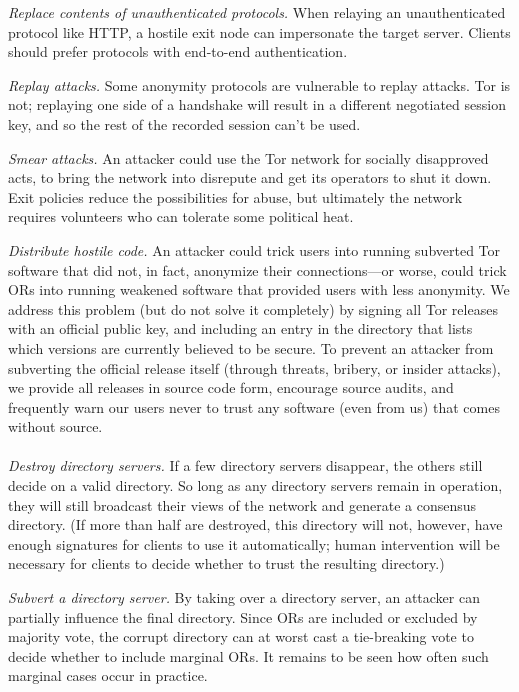 \documentclass[times,10pt,twocolumn]{article}
\begin{document}
\emph{Replace contents of unauthenticated protocols.}  When
relaying an unauthenticated protocol like HTTP, a hostile exit node
can impersonate the target server. Clients
should prefer protocols with end-to-end authentication.

\emph{Replay attacks.} Some anonymity protocols are vulnerable
to replay attacks.  Tor is not; replaying one side of a handshake
will result in a different negotiated session key, and so the rest
of the recorded session can't be used.

\emph{Smear attacks.} An attacker could use the Tor network for
socially disapproved acts, to bring the
network into disrepute and get its operators to shut it down.
Exit policies reduce the possibilities for abuse, but
ultimately the network requires volunteers who can tolerate
some political heat.

\emph{Distribute hostile code.} An attacker could trick users
into running subverted Tor software that did not, in fact, anonymize
their connections---or worse, could trick ORs into running weakened
software that provided users with less anonymity.  We address this
problem (but do not solve it completely) by signing all Tor releases
with an official public key, and including an entry in the directory
that lists which versions are currently believed to be secure.  To
prevent an attacker from subverting the official release itself
(through threats, bribery, or insider attacks), we provide all
releases in source code form, encourage source audits, and
frequently warn our users never to trust any software (even from
us) that comes without source.\\

\\
\emph{Destroy directory servers.}  If a few directory
servers disappear, the others still decide on a valid
directory.  So long as any directory servers remain in operation,
they will still broadcast their views of the network and generate a
consensus directory.  (If more than half are destroyed, this
directory will not, however, have enough signatures for clients to
use it automatically; human intervention will be necessary for
clients to decide whether to trust the resulting directory.)

\emph{Subvert a directory server.}  By taking over a directory server,
an attacker can partially influence the final directory.  Since ORs
are included or excluded by majority vote, the corrupt directory can
at worst cast a tie-breaking vote to decide whether to include
marginal ORs.  It remains to be seen how often such marginal cases
occur in practice.
\end{document}
